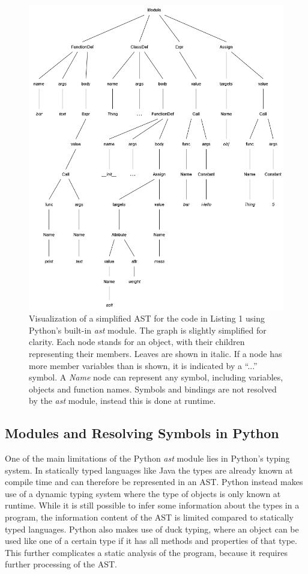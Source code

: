 \documentclass[a4paper,11pt,twoside]{article}
\theoremstyle{definition} %
\begin{document}
\begin{figure}[h!]
    \centering
    \includegraphics[width=1.0\textwidth]{Subfigures/Python_AST.png}
    \caption{Visualization of a simplified AST for the code in Listing 1 using Python’s built-in \textit{ast} module. The graph is slightly simplified for clarity. Each node stands for an object, with their children representing their members. Leaves are shown in italic. If a node has more member variables than is shown, it is indicated by a “...” symbol. A \textit{Name} node can represent any symbol, including variables, objects and function names. Symbols and bindings are not resolved by the \textit{ast} module, instead this is done at runtime.}
    \label{fig:PythonAST}
\end{figure}


\subsection{Modules and Resolving Symbols in Python} \label{SubSec:ModulesSymbolsPython}
One of the main limitations of the Python \textit{ast} module lies in Python’s typing system. In statically typed languages like Java the types are already known at compile time and can therefore be represented in an AST. Python instead makes use of a dynamic typing system where the type of objects is only known at runtime. While it is still possible to infer some information about the types in a program, the information content of the AST is limited compared to statically typed languages. Python also makes use of duck typing, where an object can be used like one of a certain type if it has all methods and properties of that type. This further complicates a static analysis of the program, because it requires further processing of the AST.
\end{document}
